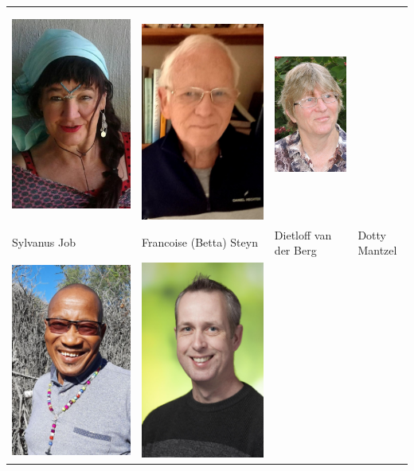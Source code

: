 \begin{tabular}{llll}
    \includegraphics[width=.2\textwidth]{betta_s.jpg} &\
    \includegraphics[width=.2\textwidth]{dietloff_s.jpg} &
    \includegraphics[width=.2\textwidth]{dotty_s.jpg} \\
    Sylvanus Job & Francoise (Betta) Steyn & Dietloff van der Berg &
    Dotty Mantzel \\
    \includegraphics[width=.2\textwidth]{willem_s.jpg} &
    \includegraphics[width=.2\textwidth]{menno_s.jpg} &

\end{tabular}
